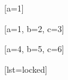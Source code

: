 \documentclass{autoexam}
\begin{document}
\begin{problems}

	[a=1]

	[a=1, b=2, c=3]

	[a=4, b=5, c=6]

	[lst=locked]

\end{problems}
\end{document}
